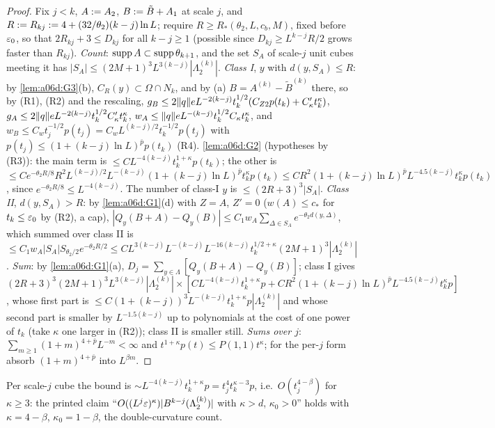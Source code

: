 \begin{proof}
Fix $j<k$, $A:= A_2$, $B:=\tilde B+A_1$ at scale $j$, and $R:= R_{kj}:=4+(32/\theta_2)(k-j)\ln L$; require $R\ge R_*(\theta_2,L,c_b,M)$, fixed before $\varepsilon_0$, so that $2R_{kj}+3\le D_{kj}$ for all $k-j\ge1$ (possible since $D_{kj}\ge L^{k-j}R/2$ grows faster than $R_{kj}$). \emph{Count}: $\operatorname{supp} A\subset\operatorname{supp}\theta_{k+1}$, and the set $S_A$ of scale-$j$ unit cubes meeting it has $|S_A|\le(2M+1)^3L^{3(k-j)}|\Lambda^{(k)}_2|$. \emph{Class I}, $y$ with $d(y,S_A)\le R$: by \cref{lem:a06d:G3}(b), $C_R(y)\subset\Omega\cap N_k$, and by (a) $B=A^{(k)}-\tilde B^{(k)}$ there, so by (R1), (R2) and the rescaling, $g_B\le2\lVert q\rVert eL^{-2(k-j)}t_k^{1/2}(C_{Z2}p(t_k)+C'_\kappa t_k^\kappa)$, $g_A\le2\lVert q\rVert eL^{-2(k-j)}t_k^{1/2}C'_\kappa t_k^\kappa$, $w_A\le\lVert q\rVert eL^{-(k-j)}t_k^{1/2}C_\kappa t_k^\kappa$, and $w_B\le C_wt_j^{-1/2}p(t_j)=C_wL^{(k-j)/2}t_k^{-1/2}p(t_j)$ with $p(t_j)\le(1+(k-j)\ln L)^{\bar p}p(t_k)$ (R4). \cref{lem:a06d:G2} (hypotheses by (R3)): the main term is $\le CL^{-4(k-j)}t_k^{1+\kappa}p(t_k)$; the other is $\le Ce^{-\theta_2R/8}R^2L^{(k-j)/2}L^{-(k-j)}(1+(k-j)\ln L)^{\bar p}t_k^\kappa p(t_k)\le CR^2(1+(k-j)\ln L)^{\bar p}L^{-4.5(k-j)}t_k^\kappa p(t_k)$, since $e^{-\theta_2R/8}\le L^{-4(k-j)}$. The number of class-I $y$ is $\le(2R+3)^3|S_A|$. \emph{Class II}, $d(y,S_A)>R$: by \cref{lem:a06d:G1}(d) with $Z=A$, $Z'=0$ ($w(A)\le c_*$ for $t_k\le\varepsilon_0$ by (R2), a cap), $|Q_y(B+A)-Q_y(B)|\le C_1w_A\sum_{\Delta\in S_A}e^{-\theta_2d(y,\Delta)}$, which summed over class II is $\le C_1w_A|S_A|S_{\theta_2/2}e^{-\theta_2R/2}\le CL^{3(k-j)}L^{-(k-j)}L^{-16(k-j)}t_k^{1/2+\kappa}(2M+1)^3|\Lambda^{(k)}_2|$. \emph{Sum}: by \cref{lem:a06d:G1}(a), $D_j=\sum_{y\in\Lambda}[Q_y(B+A)-Q_y(B)]$; class I gives $(2R+3)^3(2M+1)^3L^{3(k-j)}|\Lambda^{(k)}_2|\times[CL^{-4(k-j)}t_k^{1+\kappa}p+CR^2(1+(k-j)\ln L)^{\bar p}L^{-4.5(k-j)}t_k^\kappa p]$, whose first part is $\le C(1+(k-j))^3L^{-(k-j)}t_k^{1+\kappa}p|\Lambda^{(k)}_2|$ and whose second part is smaller by $L^{-1.5(k-j)}$ up to polynomials at the cost of one power of $t_k$ (take $\kappa$ one larger in (R2)); class II is smaller still. \emph{Sums over $j$}: $\sum_{m\ge1}(1+m)^{4+\bar p}L^{-m}<\infty$ and $t^{1+\kappa}p(t)\le P(1,1)t^\kappa$; for the per-$j$ form absorb $(1+m)^{4+\bar p}$ into $L^{\beta m}$.
\end{proof}

Per scale-$j$ cube the bound is $\sim L^{-4(k-j)}t_k^{1+\kappa}p=t_j^4t_k^{\kappa-3}p$, i.e.\ $O(t_j^{4-\beta})$ for $\kappa\ge3$: the printed claim ``$O((L^j\varepsilon)^\kappa)|B^{k-j}(\Lambda^{(k)}_2)|$ with $\kappa>d$, $\kappa_0>0$'' holds with $\kappa=4-\beta$, $\kappa_0=1-\beta$, the double-curvature count.

